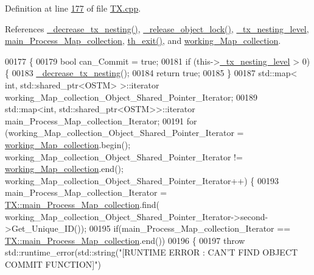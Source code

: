Definition at line \hyperlink{_t_x_8cpp_source_l00177}{177} of file \hyperlink{_t_x_8cpp_source}{T\+X.\+cpp}.



References \hyperlink{_t_x_8cpp_source_l00279}{\+\_\+decrease\+\_\+tx\+\_\+nesting()}, \hyperlink{_t_x_8cpp_source_l00253}{\+\_\+release\+\_\+object\+\_\+lock()}, \hyperlink{_t_x_8h_source_l00101}{\+\_\+tx\+\_\+nesting\+\_\+level}, \hyperlink{_t_x_8h_source_l00105}{main\+\_\+\+Process\+\_\+\+Map\+\_\+collection}, \hyperlink{_t_x_8cpp_source_l00052}{th\+\_\+exit()}, and \hyperlink{_t_x_8h_source_l00093}{working\+\_\+\+Map\+\_\+collection}.


\begin{DoxyCode}
00177                 \{
00179     \textcolor{keywordtype}{bool} can\_Commit = \textcolor{keyword}{true};
00181     \textcolor{keywordflow}{if} (this->\hyperlink{class_t_x_ae8f413fd7f4fea322e7ad3c668f9898e_ae8f413fd7f4fea322e7ad3c668f9898e}{\_tx\_nesting\_level} > 0) \{
00183         \hyperlink{class_t_x_aa3ac499f576326588628ade96b27b4b1_aa3ac499f576326588628ade96b27b4b1}{\_decrease\_tx\_nesting}();
00184         \textcolor{keywordflow}{return} \textcolor{keyword}{true};
00185     \} 
00187     std::map< int, std::shared\_ptr<OSTM> >::iterator working\_Map\_collection\_Object\_Shared\_Pointer\_Iterator;
00189     std::map<int, std::shared\_ptr<OSTM>>::iterator main\_Process\_Map\_collection\_Iterator;
00191     \textcolor{keywordflow}{for} (working\_Map\_collection\_Object\_Shared\_Pointer\_Iterator = 
      \hyperlink{class_t_x_a81aafda16e2f20e36ec6c68e584668ff_a81aafda16e2f20e36ec6c68e584668ff}{working\_Map\_collection}.begin(); working\_Map\_collection\_Object\_Shared\_Pointer\_Iterator
       != \hyperlink{class_t_x_a81aafda16e2f20e36ec6c68e584668ff_a81aafda16e2f20e36ec6c68e584668ff}{working\_Map\_collection}.end(); 
      working\_Map\_collection\_Object\_Shared\_Pointer\_Iterator++) \{
00193             main\_Process\_Map\_collection\_Iterator = 
      \hyperlink{class_t_x_a1a45d726894190695314464d7cd97c29_a1a45d726894190695314464d7cd97c29}{TX::main\_Process\_Map\_collection}.find(
      working\_Map\_collection\_Object\_Shared\_Pointer\_Iterator->second->Get\_Unique\_ID());
00195             \textcolor{keywordflow}{if}(main\_Process\_Map\_collection\_Iterator == 
      \hyperlink{class_t_x_a1a45d726894190695314464d7cd97c29_a1a45d726894190695314464d7cd97c29}{TX::main\_Process\_Map\_collection}.end())
00196             \{
00197                 \textcolor{keywordflow}{throw} std::runtime\_error(std::string(\textcolor{stringliteral}{"[RUNTIME ERROR : CAN'T FIND OBJECT COMMIT FUNCTION]"})

\end{DoxyCode}
